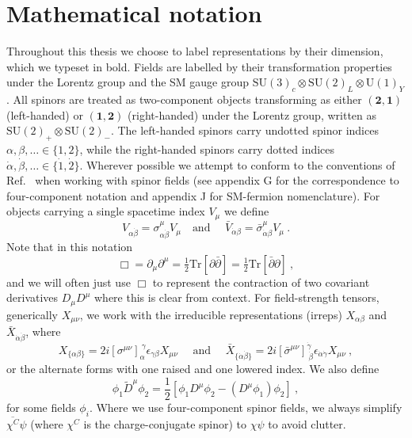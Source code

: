 
\chapter{Mathematical notation}
\label{chapter:notation}

Throughout this thesis we choose to label representations by their dimension,
which we typeset in bold. Fields are labelled by their transformation properties
under the Lorentz group and the SM gauge group
$\mathrm{SU}(3)_{c} \otimes \mathrm{SU}(2)_{L} \otimes \mathrm{U}(1)_{Y}$. All
spinors are treated as two-component objects transforming as either
$(\mathbf{2}, \mathbf{1})$ (left-handed) or $(\mathbf{1}, \mathbf{2})$
(right-handed) under the Lorentz group, written as
$\mathrm{SU}(2)_{+} \otimes \mathrm{SU}(2)_{-}$. The left-handed spinors carry
undotted spinor indices $\alpha, \beta, \ldots \in \{1, 2\}$, while the
right-handed spinors carry dotted indices
$\dot{\alpha}, \dot{\beta}, \ldots \in \{\dot{1}, \dot{2}\}$. Wherever possible
we attempt to conform to the conventions of Ref.~\cite{Dreiner:2008tw} when
working with spinor fields (see appendix G for the correspondence to
four-component notation and appendix J for SM-fermion nomenclature). For objects
carrying a single spacetime index $V_\mu$ we define
\begin{equation}
  V_{\alpha \dot{\beta}} = \sigma^\mu_{\alpha \dot{\beta}} V_\mu \quad \text{
    and
  } \quad \bar{V}_{\dot{\alpha}\beta } = \bar{\sigma}^\mu_{\dot{\alpha}\beta} V_{\mu} \ .
\end{equation}
Note that in this notation
\begin{equation}
  \Box = \partial_{\mu} \partial^{\mu} = \tfrac{1}{2}\text{Tr}[\partial \bar{\partial}] = \tfrac{1}{2}\text{Tr}[\bar{\partial} \partial] \ ,
\end{equation}
and we will often just use $\Box$ to represent the contraction of two covariant
derivatives $D_{\mu}D^{\mu}$ where this is clear from context. For
field-strength tensors, generically $X_{\mu\nu}$, we work with the irreducible
representations (irreps) $X_{\alpha \beta}$ and
$\bar{X}_{\dot{\alpha} \dot{\beta}}$, where
\begin{equation}
  X_{\{\alpha \beta\}} = 2i [\sigma^{\mu \nu}]^{~\gamma}_\alpha \epsilon_{\gamma \beta} X_{\mu \nu} \quad \text{ and } \quad
  \bar{X}_{\{\dot{\alpha} \dot{\beta}\}} = 2i [\bar{\sigma}^{\mu \nu}]^{\dot{\gamma}}_{~\dot{\beta}} \epsilon_{\dot{\alpha} \dot{\gamma}} X_{\mu \nu} \ ,
\end{equation}
or the alternate forms with one raised and one lowered index. We also define
\begin{equation}
  \label{eq:app-bidirectional-deriv}
  \phi_{1} \tilde{D}^{\mu} \phi_{2} = \frac{1}{2} [\phi_{1} D^{\mu} \phi_{2} - (D^{\mu}\phi_{1})\phi_{2}] \ ,
\end{equation}
for some fields $\phi_{i}$. Where we use four-component spinor fields, we always
simplify $\overline{\chi^{C}}\psi$ (where $\chi^{C}$ is the charge-conjugate
spinor) to $\chi \psi$ to avoid clutter.

